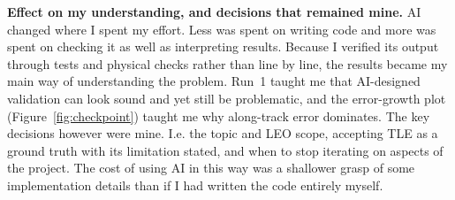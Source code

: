 \documentclass[11pt, a4paper]{article}
\begin{document}
\textbf{Effect on my understanding, and decisions that remained mine.} AI changed where I spent my effort. Less was spent on writing code and more was spent on checking it as well as interpreting results. Because I verified its output through tests and physical checks rather than line by line, the results became my main way of understanding the problem. Run~1 taught me that AI-designed validation can look sound and yet still be problematic, and the error-growth plot (Figure~\ref{fig:checkpoint}) taught me why along-track error dominates. The key decisions however were mine. I.e. the topic and LEO scope, accepting TLE as a ground truth with its limitation stated, and when to stop iterating on aspects of the project. The cost of using AI in this way was a shallower grasp of some implementation details than if I had written the code entirely myself.

\clearpage
\end{document}
